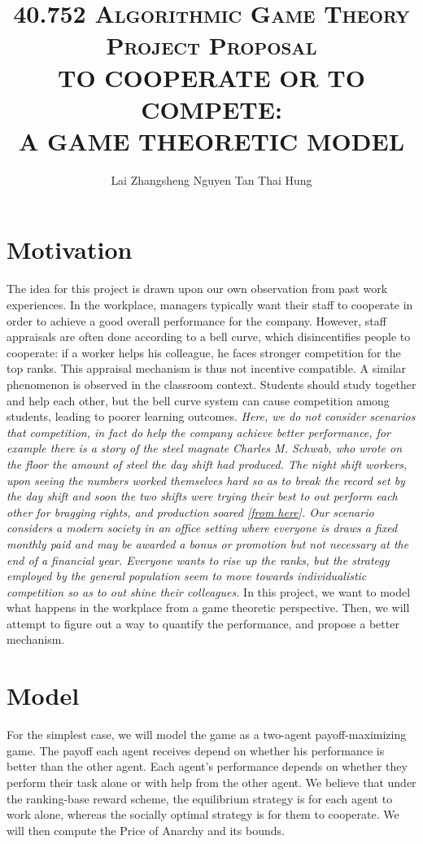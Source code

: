 \documentclass[11pt, a4paper]{article}
\title{
	\vspace*{-1.5cm}
	\scshape 40.752 Algorithmic Game Theory\\
	\vspace{0.5cm}
	Project Proposal\\
	\vspace{0.5cm}
	{\bfseries\Large TO COOPERATE OR TO COMPETE: \\
		A GAME THEORETIC MODEL}\\
	\vspace{0.5cm}}
\author{Lai Zhangsheng \qquad \qquad Nguyen Tan Thai Hung}
\date{}
\begin{document}
	
	\maketitle
	
	
	\section{Motivation}
	The idea for this project is drawn upon our own observation from past work experiences. In the workplace, managers typically want their staff to cooperate in order to achieve a good overall performance for the company. However, staff appraisals are often done according to a bell curve, which disincentifies people to cooperate: if a worker helps his colleague, he faces stronger competition for the top ranks. This appraisal mechanism is thus not incentive compatible. A similar phenomenon is observed in the classroom context. Students should study together and help each other, but the bell curve system can cause competition among students, leading to poorer learning outcomes. \emph{Here, we do not consider scenarios that competition, in fact do help the company achieve better performance, for example there is a story of the steel magnate Charles M. Schwab, who wrote on the floor the amount of steel the day shift had produced. The night shift workers, upon seeing the numbers worked themselves hard so as to break the record set by the day shift and soon the two shifts were trying their best to out perform each other for bragging rights, and production soared [\href{https://hbr.org/2012/05/the-darwinian-workplace}{from here}]. Our scenario considers a modern society in an office setting where everyone is draws a fixed monthly paid and may be awarded a bonus or promotion but not necessary at the end of a financial year. Everyone wants to rise up the ranks, but the strategy employed by the general population seem to move towards individualistic competition so as to out shine their colleagues.} In this project, we want to model what happens in the workplace from a game theoretic perspective. Then, we will attempt to figure out a way to quantify the performance, and propose a better mechanism. 
	
	\section{Model}
	For the simplest case, we will model the game as a two-agent payoff-maximizing game. The payoff each agent receives depend on whether his performance is better than the other agent. Each agent's performance depends on whether they perform their task alone or with help from the other agent. We believe that under the ranking-base reward scheme, the equilibrium strategy is for each agent to work alone, whereas the socially optimal strategy is for them to cooperate. We will then compute the Price of Anarchy and its bounds.
	
\end{document}
